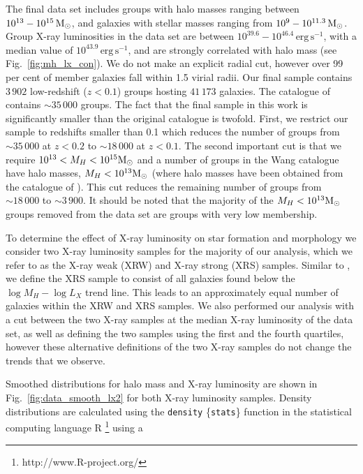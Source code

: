 The final data set includes groups with halo masses ranging between
$10^{13} - 10^{15}\,\mathrm{M_{\odot}}$, and galaxies with stellar masses ranging
from $10^9 - 10^{11.3}\,\mathrm{M_{\odot}}$.  Group X-ray luminosities in the data
set are between $10^{39.6} -
10^{46.4}\,\mathrm{erg}\,\mathrm{s^{-1}}$, with a median value of
$10^{43.9}\,\mathrm{erg}\,\mathrm{s^{-1}}$, and are strongly
correlated with halo mass (see Fig.~\ref{fig:mh_lx_con}).  We do not
make an explicit radial cut, however over 99 per cent of member
galaxies fall within 1.5 virial radii.  Our final sample contains
$3\,902$ low-redshift ($z < 0.1$) groups hosting $41\,173$ galaxies.
The catalogue of \citet{wang2014} contains $\sim 35\,000$ groups.  The
fact that the final sample in this work is significantly smaller than
the original catalogue is twofold.  First, we restrict our sample to
redshifts smaller than 0.1 which reduces the number of groups from
$\sim 35\,000$ at $z < 0.2$ to $\sim 18\,000$ at $z < 0.1$.  The
second important cut is that we require $10^{13} < M_H < 10^{15}\mathrm{M_{\odot}}$
and a number of groups in the Wang catalogue have halo masses, $M_H <
10^{13}\mathrm{M_{\odot}}$ (where halo masses have been obtained from the catalogue
of \citealt{yang2007}).  This cut reduces the remaining number of
groups from $\sim 18\,000$ to $\sim 3\,900$.  It should be noted that
the majority of the $M_H < 10^{13}\mathrm{M_{\odot}}$ groups removed from the data
set are groups with very low membership.
\par
To determine the effect of X-ray luminosity on star formation and
morphology we consider two X-ray luminosity samples for the majority
of our analysis, which we refer to as the X-ray weak (XRW) and X-ray
strong (XRS) samples.  Similar to \citet{wang2014}, we define the XRS
sample to consist of all galaxies found below the $\log M_H - \log
L_X$ trend line.  This leads to an approximately equal number of
galaxies within the XRW and XRS samples.  We also performed our
analysis with a cut between the two X-ray samples at the median X-ray
luminosity of the data set, as well as defining the two samples using
the first and the fourth quartiles, however these alternative
definitions of the two X-ray samples do not change the trends that we
observe.
\par
Smoothed distributions for halo mass and X-ray luminosity are shown in
Fig.~\ref{fig:data_smooth_lx2} for both X-ray luminosity samples.
Density distributions are calculated using the \texttt{density}
\{\texttt{stats}\} function in the statistical computing language
\textsc{R} \citep{r2013}\footnote{http://www.R-project.org/} using a
